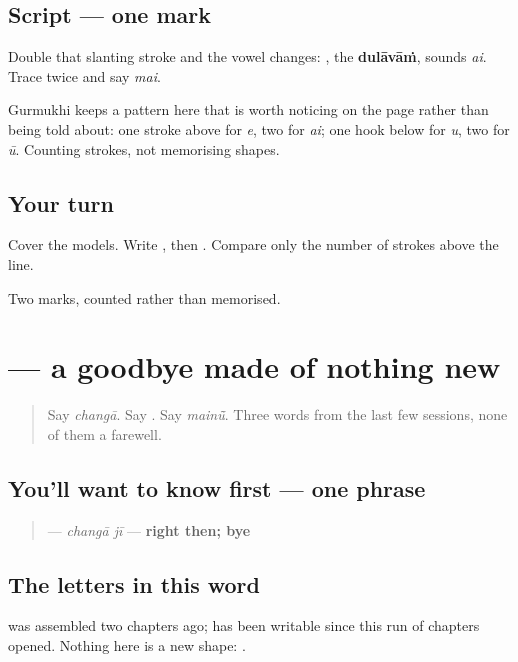 \subsection*{Script — one mark}
Double that slanting stroke and the vowel changes: \textbf{}, the \textbf{dulāvāṁ}, sounds \emph{ai}. Trace \textbf{} twice and say \emph{mai}.

Gurmukhi keeps a pattern here that is worth noticing on the page rather than being told about: one stroke above for \emph{e}, two for \emph{ai}; one hook below for \emph{u}, two for \emph{ū}. Counting strokes, not memorising shapes.

\subsection*{Your turn}
Cover the models. Write \textbf{}, then \textbf{}. Compare only the number of strokes above the line.

\begin{tcolorbox}[breakable,colback=teal!4,colframe=teal!35!black,title={Before you move on}]
Two marks, counted rather than memorised.
\end{tcolorbox}
\section[\texorpdfstring{\pa{ਚੰਗਾ} \pa{ਜੀ} (changā jī)}{ਚੰਗਾ ਜੀ (changā jī)}]{  — a goodbye made of nothing new}

\label{lesson:PA-C35-changa-ji}



\begin{quote}
Say \emph{changā}. Say \textbf{}. Say \emph{mainū̃}. Three words from the last few sessions, none of them a farewell.
\end{quote}

\subsection*{You'll want to know first — one phrase}
\begin{quote}
\textbf{ } — \emph{changā jī} — \textbf{right then; bye}
\end{quote}

\subsection*{The letters in this word}
\textbf{} was assembled two chapters ago; \textbf{} has been writable since this run of chapters opened. Nothing here is a new shape: \textbf{ }.

